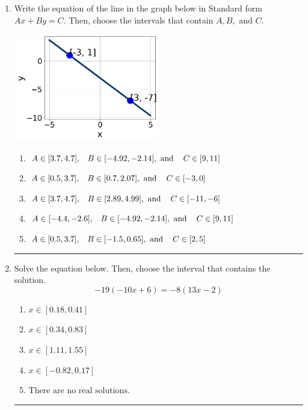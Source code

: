 \documentclass[14pt]{extbook}
\newcommand{\litem}[1]{\item#1\hspace*{-1cm}\rule{\textwidth}{0.4pt}}
\begin{document}
\begin{enumerate}
{\begin{enumerate}[label=\Alph*.]
\end{enumerate} }
\litem{
Write the equation of the line in the graph below in Standard form $Ax+By=C$. Then, choose the intervals that contain $A, B, \text{ and } C$.
\begin{center}
    \includegraphics[width=0.5\textwidth]{../Figures/linearGraphToStandardB.png}
\end{center}
\begin{enumerate}[label=\Alph*.]
\item \( A \in [3.7, 4.7], \hspace{3mm} B \in [-4.92, -2.14], \text{ and } \hspace{3mm} C \in [9, 11] \)
\item \( A \in [0.5, 3.7], \hspace{3mm} B \in [0.7, 2.07], \text{ and } \hspace{3mm} C \in [-3, 0] \)
\item \( A \in [3.7, 4.7], \hspace{3mm} B \in [2.89, 4.99], \text{ and } \hspace{3mm} C \in [-11, -6] \)
\item \( A \in [-4.4, -2.6], \hspace{3mm} B \in [-4.92, -2.14], \text{ and } \hspace{3mm} C \in [9, 11] \)
\item \( A \in [0.5, 3.7], \hspace{3mm} B \in [-1.5, 0.65], \text{ and } \hspace{3mm} C \in [2, 5] \)

\end{enumerate} }
\litem{
Solve the equation below. Then, choose the interval that contains the solution.\[ -19(-10x + 6) = -8(13x -2) \]\begin{enumerate}[label=\Alph*.]
\item \( x \in [0.18, 0.41] \)
\item \( x \in [0.34, 0.83] \)
\item \( x \in [1.11, 1.55] \)
\item \( x \in [-0.82, 0.17] \)
\item \( \text{There are no real solutions.} \)

\end{enumerate} }
\end{enumerate}
\end{document}

